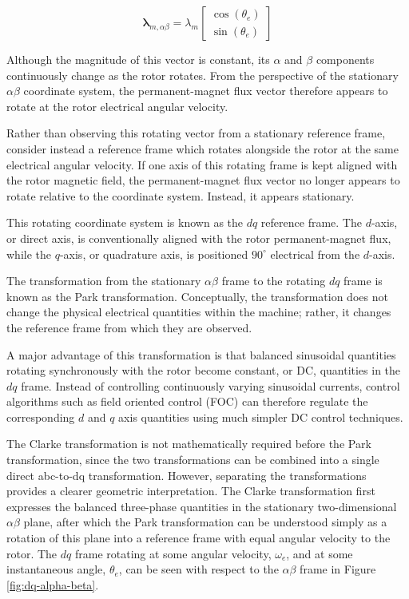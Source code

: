 \documentclass{article}
\begin{document}
\begin{equation}
    \boldsymbol{\lambda}_{m,\alpha\beta}
    =
    \lambda_m
    \begin{bmatrix}
        \cos(\theta_e) \\
        \sin(\theta_e)
    \end{bmatrix}
\end{equation}

Although the magnitude of this vector is constant, its $\alpha$ and $\beta$ components continuously change as the rotor rotates. From the perspective of the stationary $\alpha\beta$ coordinate system, the permanent-magnet flux vector therefore appears to rotate at the rotor electrical angular velocity.

Rather than observing this rotating vector from a stationary reference frame, consider instead a reference frame which rotates alongside the rotor at the same electrical angular velocity. If one axis of this rotating frame is kept aligned with the rotor magnetic field, the permanent-magnet flux vector no longer appears to rotate relative to the coordinate system. Instead, it appears stationary.

This rotating coordinate system is known as the $dq$ reference frame. The $d$-axis, or direct axis, is conventionally aligned with the rotor permanent-magnet flux, while the $q$-axis, or quadrature axis, is positioned $90^\circ$ electrical from the $d$-axis.

The transformation from the stationary $\alpha\beta$ frame to the rotating $dq$ frame is known as the Park transformation. Conceptually, the transformation does not change the physical electrical quantities within the machine; rather, it changes the reference frame from which they are observed.

A major advantage of this transformation is that balanced sinusoidal quantities rotating synchronously with the rotor become constant, or DC, quantities in the $dq$ frame. Instead of controlling continuously varying sinusoidal currents, control algorithms such as field oriented control (FOC) can therefore regulate the corresponding $d$ and $q$ axis quantities using much simpler DC control techniques.

The Clarke transformation is not mathematically required before the Park transformation, since the two transformations can be combined into a single direct abc-to-dq transformation. However, separating the transformations provides a clearer geometric interpretation. The Clarke transformation first expresses the balanced three-phase quantities in the stationary two-dimensional $\alpha\beta$ plane, after which the Park transformation can be understood simply as a rotation of this plane into a reference frame with equal angular velocity to the rotor. The $dq$ frame rotating at some angular velocity, $\omega_e$, and at some instantaneous angle, $\theta_e$, can be seen with respect to the $\alpha\beta$ frame in Figure \ref{fig:dq-alpha-beta}.
\end{document}
